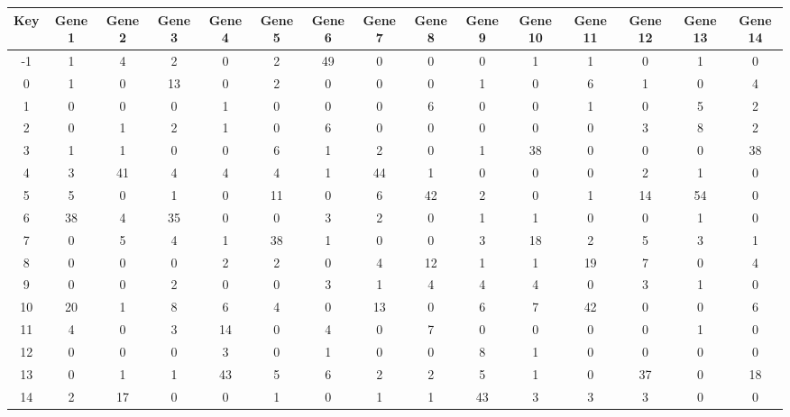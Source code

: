 \begin{tabular}{|c|c|c|c|c|c|c|c|c|c|c|c|c|c|c|}
\hline
Key & Gene 1 & Gene 2 & Gene 3 & Gene 4 & Gene 5 & Gene 6 & Gene 7 & Gene 8 & Gene 9 & Gene 10 & Gene 11 & Gene 12 & Gene 13 & Gene 14 \\
\hline
-1 & 1 & 4 & 2 & 0 & 2 & 49 & 0 & 0 & 0 & 1 & 1 & 0 & 1 & 0 \\
0 & 1 & 0 & 13 & 0 & 2 & 0 & 0 & 0 & 1 & 0 & 6 & 1 & 0 & 4 \\
1 & 0 & 0 & 0 & 1 & 0 & 0 & 0 & 6 & 0 & 0 & 1 & 0 & 5 & 2 \\
2 & 0 & 1 & 2 & 1 & 0 & 6 & 0 & 0 & 0 & 0 & 0 & 3 & 8 & 2 \\
3 & 1 & 1 & 0 & 0 & 6 & 1 & 2 & 0 & 1 & 38 & 0 & 0 & 0 & 38 \\
4 & 3 & 41 & 4 & 4 & 4 & 1 & 44 & 1 & 0 & 0 & 0 & 2 & 1 & 0 \\
5 & 5 & 0 & 1 & 0 & 11 & 0 & 6 & 42 & 2 & 0 & 1 & 14 & 54 & 0 \\
6 & 38 & 4 & 35 & 0 & 0 & 3 & 2 & 0 & 1 & 1 & 0 & 0 & 1 & 0 \\
7 & 0 & 5 & 4 & 1 & 38 & 1 & 0 & 0 & 3 & 18 & 2 & 5 & 3 & 1 \\
8 & 0 & 0 & 0 & 2 & 2 & 0 & 4 & 12 & 1 & 1 & 19 & 7 & 0 & 4 \\
9 & 0 & 0 & 2 & 0 & 0 & 3 & 1 & 4 & 4 & 4 & 0 & 3 & 1 & 0 \\
10 & 20 & 1 & 8 & 6 & 4 & 0 & 13 & 0 & 6 & 7 & 42 & 0 & 0 & 6 \\
11 & 4 & 0 & 3 & 14 & 0 & 4 & 0 & 7 & 0 & 0 & 0 & 0 & 1 & 0 \\
12 & 0 & 0 & 0 & 3 & 0 & 1 & 0 & 0 & 8 & 1 & 0 & 0 & 0 & 0 \\
13 & 0 & 1 & 1 & 43 & 5 & 6 & 2 & 2 & 5 & 1 & 0 & 37 & 0 & 18 \\
14 & 2 & 17 & 0 & 0 & 1 & 0 & 1 & 1 & 43 & 3 & 3 & 3 & 0 & 0 \\
\hline
\end{tabular}